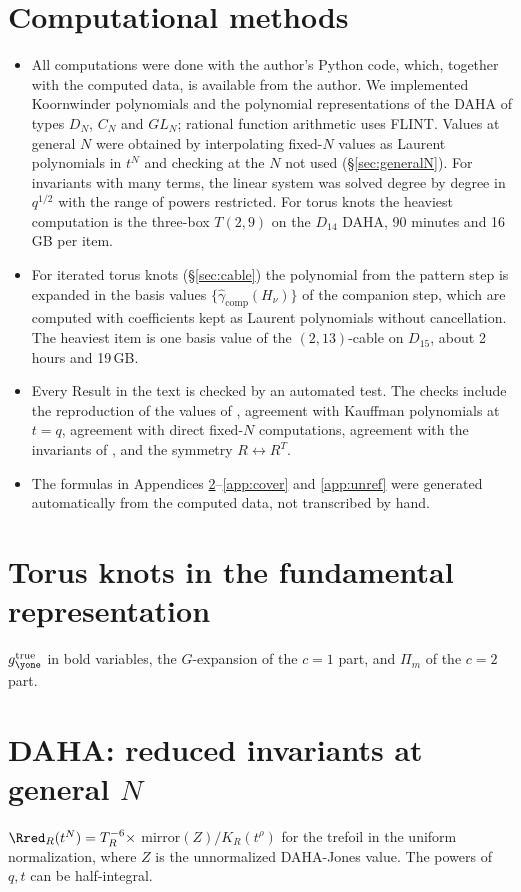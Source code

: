 \section{Computational methods}\label{app:code}
\begin{itemize}
\item All computations were done with the author's Python code, which, together with the computed data, is available from the author. We implemented Koornwinder polynomials and the polynomial representations of the DAHA of types $D_N$, $C_N$ and $GL_N$; rational function arithmetic uses FLINT. Values at general $N$ were obtained by interpolating fixed-$N$ values as Laurent polynomials in $t^N$ and checking at the $N$ not used (\S\ref{sec:generalN}). For invariants with many terms, the linear system was solved degree by degree in $q^{1/2}$ with the range of powers restricted. For torus knots the heaviest computation is the three-box $T(2,9)$ on the $D_{14}$ DAHA, 90 minutes and 16\,GB per item.
\item For iterated torus knots (\S\ref{sec:cable}) the polynomial from the pattern step is expanded in the basis values $\{\hat\gamma_{\mathrm{comp}}(H_\nu)\}$ of the companion step, which are computed with coefficients kept as Laurent polynomials without cancellation. The heaviest item is one basis value of the $(2,13)$-cable on $D_{15}$, about 2 hours and 19\,GB.
\item Every Result in the text is checked by an automated test. The checks include the reproduction of the values of \cite{Marino09}, agreement with Kauffman polynomials at $t = q$, agreement with direct fixed-$N$ computations, agreement with the invariants of \cite{KN17}, and the symmetry $R \leftrightarrow R^T$.
\item The formulas in Appendices \ref{app:torus}--\ref{app:cover} and \ref{app:unref} were generated automatically from the computed data, not transcribed by hand.
\end{itemize}

\section{Torus knots in the fundamental representation}\label{app:torus}
$g^{\mathrm{true}}_{\yone}$ in bold variables, the $G$-expansion of the $c = 1$ part, and $\Pi_m$ of the $c = 2$ part.


\section{DAHA: reduced invariants at general \texorpdfstring{$N$}{N}}\label{app:daha}
$\Rred_R(t^N) = T_R^{-6}\times$ mirror$(Z)/K_R(t^\rho)$ for the trefoil in the uniform normalization, where $Z$ is the unnormalized DAHA-Jones value. The powers of $q, t$ can be half-integral.



